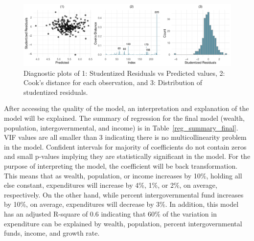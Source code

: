 \documentclass[11pt]{article}\usepackage[]{graphicx}\usepackage[]{color}
\makeatletter
\def\maxwidth{ %
  \ifdim\Gin@nat@width>\linewidth
    \linewidth
  \else
    \Gin@nat@width
  \fi
}
\makeatother
\begin{document}
\begin{figure}[h!] 
\begin{center}

\includegraphics[width=\maxwidth]{figure/unnamed-chunk-5-1} 

\caption{Diagnostic plots of 1: Studentized Residuals vs Predicted values, 2: Cook's distance for each observation, and 3: Distribution of studentized residuals.}
\label{diag-plot1}
\end{center} 
\end{figure}

\noindent After accessing the quality of the model, an interpretation and explanation of the model will be explained. The summary of regression for the final model (wealth, population, intergovernmental, and income) is in Table~\ref{reg_summary_final}. VIF values are all smaller than 3 indicating there is no multicollinearity problem in the model. Confident intervals for majority of coefficients do not contain zeros and small p-values implying they are statistically significant in the model. For the purpose of interpreting the model, the coefficient will be back transformation. This means that as wealth, population, or income increases by 10\%, holding all else constant, expenditures will increase by 4\%, 1\%, or 2\%, on average, respectively. On the other hand, while percent intergovernmental fund increases by 10\%, on average, expenditures will decrease by 3\%. In addition, this model has an adjusted R-square of 0.6 indicating that 60\% of the variation in expenditure can be explained by wealth, population, percent intergovernmental funds, income, and growth rate.   
\end{document}
